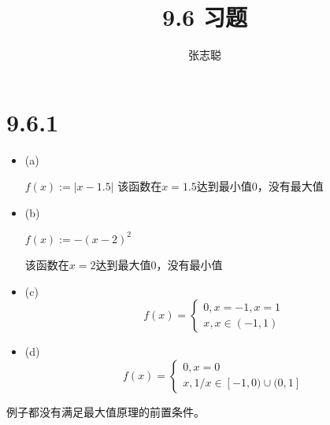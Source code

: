 \documentclass{article}
\begin{document}
\title{9.6 习题}
\author{张志聪}
\maketitle

\section*{9.6.1}

\begin{itemize}
  \item (a)

        $f(x) := |x - 1.5|$
        该函数在$x = 1.5$达到最小值$0$，没有最大值

  \item (b)

        $f(x) := -(x-2)^2$

        该函数在$x = 2$达到最大值$0$，没有最小值

  \item (c)
        \begin{equation*}
          f(x) =
          \begin{cases*}
            0,  x=-1,x=1 \\
            x,  x \in (-1, 1)
          \end{cases*}
        \end{equation*}

  \item (d)
        \begin{equation*}
          f(x) =
          \begin{cases*}
            0,  x=0 \\
            x,  1/x \in [-1, 0) \cup (0, 1]
          \end{cases*}
        \end{equation*}
\end{itemize}

例子都没有满足最大值原理的前置条件。
\end{document}
